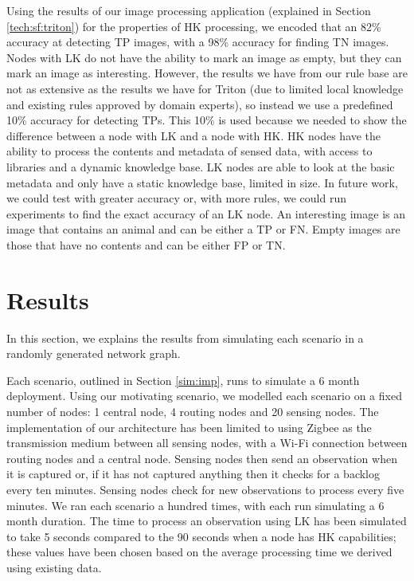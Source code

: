 	Using the results of our image processing application (explained in Section \ref{tech:sf:triton}) for the properties of HK processing, we encoded that an 82\% accuracy at detecting TP images, with a 98\% accuracy for finding TN images. Nodes with LK do not have the ability to mark an image as empty, but they can mark an image as interesting. However, the results we have from our rule base are not as extensive as the results we have for Triton (due to limited local knowledge and existing rules approved by domain experts), so instead we use a predefined 10\% accuracy for detecting TPs. This 10\% is used because we needed to show the difference between a node with LK and a node with HK. HK nodes have the ability to process the contents and metadata of sensed data, with access to libraries and a dynamic knowledge base. LK nodes are able to look at the basic metadata and only have a static knowledge base, limited in size. In future work, we could test with greater accuracy or, with more rules, we could run experiments to find the exact accuracy of an LK node. An interesting image is an image that contains an animal and can be either a TP or FN. Empty images are those that have no contents and can be either FP or TN.
	

\section{Results}\label{sim:res}
In this section, we explains the results from simulating each scenario in a randomly generated network graph. 

Each scenario, outlined in Section \ref{sim:imp}, runs to simulate a 6 month deployment. Using our motivating scenario, we modelled each scenario on a fixed number of nodes: 1 central node, 4 routing nodes and 20 sensing nodes. The implementation of our architecture has been limited to using Zigbee as the transmission medium between all sensing nodes, with a Wi-Fi connection between routing nodes and a central node. Sensing nodes then send an observation when it is captured or, if it has not captured anything then it checks for a backlog every ten minutes. Sensing nodes check for new observations to process every five minutes. We ran each scenario a hundred times, with each run simulating a 6 month duration. The time to process an observation using LK has been simulated to take 5 seconds compared to the 90 seconds when a node has HK capabilities; these values have been chosen based on the average processing time we derived using existing data. 

